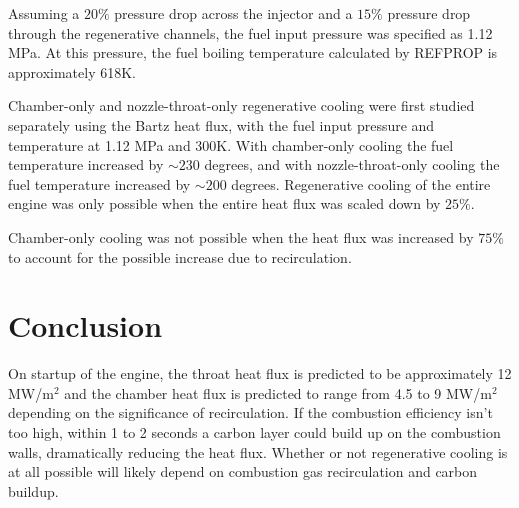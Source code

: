 \documentclass[11pt]{article}
\begin{document}
Assuming a $20\%$ pressure drop across the injector and a $15\%$ pressure drop through the regenerative channels, the fuel input pressure was specified as 1.12 MPa. At this pressure, the fuel boiling temperature calculated by REFPROP is approximately 618K.

Chamber-only and nozzle-throat-only regenerative cooling were first studied separately using the Bartz heat flux, with the fuel input pressure and temperature at 1.12 MPa and 300K. With chamber-only cooling the fuel temperature increased by $\sim 230$ degrees, and with nozzle-throat-only cooling the fuel temperature increased by $\sim 200$ degrees. Regenerative cooling of the entire engine was only possible when the entire heat flux was scaled down by $25\%$.

Chamber-only cooling was not possible when the heat flux was increased by $75\%$ to account for the possible increase due to recirculation.

\section{Conclusion}

On startup of the engine, the throat heat flux is predicted to be approximately 12 MW/m$^2$ and the chamber heat flux is predicted to range from 4.5 to 9 MW/m$^2$ depending on the significance of recirculation. If the combustion efficiency isn't too high, within 1 to 2 seconds a carbon layer could build up on the combustion walls, dramatically reducing the heat flux. Whether or not regenerative cooling is at all possible will likely depend on combustion gas recirculation and carbon buildup.

\printbibliography
\end{document}
